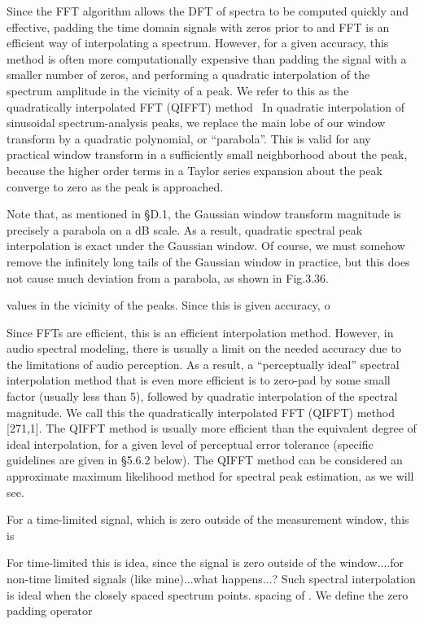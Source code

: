 Since the FFT algorithm allows the DFT of spectra to be computed quickly and
effective, padding the time domain signals with zeros prior to and FFT is an
efficient way of interpolating a spectrum. However, for a given accuracy, this
method is often more computationally expensive than padding the signal with a
smaller number of zeros, and performing a quadratic interpolation of the
spectrum amplitude in the vicinity of a peak. We refer to this as the
quadratically interpolated FFT (QIFFT) method~\cite{}
In quadratic interpolation of sinusoidal spectrum-analysis peaks, we replace the main lobe of our window transform by a quadratic polynomial, or ``parabola''. This is valid for any practical window transform in a sufficiently small neighborhood about the peak, because the higher order terms in a Taylor series expansion about the peak converge to zero as the peak is approached.

Note that, as mentioned in §D.1, the Gaussian window transform magnitude is precisely a parabola on a dB scale. As a result, quadratic spectral peak interpolation is exact under the Gaussian window. Of course, we must somehow remove the infinitely long tails of the Gaussian window in practice, but this does not cause much deviation from a parabola, as shown in Fig.3.36.

values in the vicinity of the peaks. Since this is given accuracy, o

Since FFTs are efficient, this is an efficient interpolation method.
However, in audio spectral modeling, there is usually a limit on the needed
accuracy due to the limitations of audio perception.
As a result, a ``perceptually ideal'' spectral interpolation method that is even more efficient is to zero-pad by some small factor (usually less than 5), followed by quadratic interpolation of the spectral magnitude. We call this the quadratically interpolated FFT (QIFFT) method [271,1]. The QIFFT method is usually more efficient than the equivalent degree of ideal interpolation, for a given level of perceptual error tolerance (specific guidelines are given in §5.6.2 below). The QIFFT method can be considered an approximate maximum likelihood method for spectral peak estimation, as we will see.

For a time-limited signal, which is zero outside of the measurement window, this
is


For time-limited this is idea, since the signal is zero outside of the
window....for non-time limited signals (like mine)...what happens...? Such
spectral interpolation is ideal when the closely spaced spectrum points. spacing
of . We define the zero padding operator


